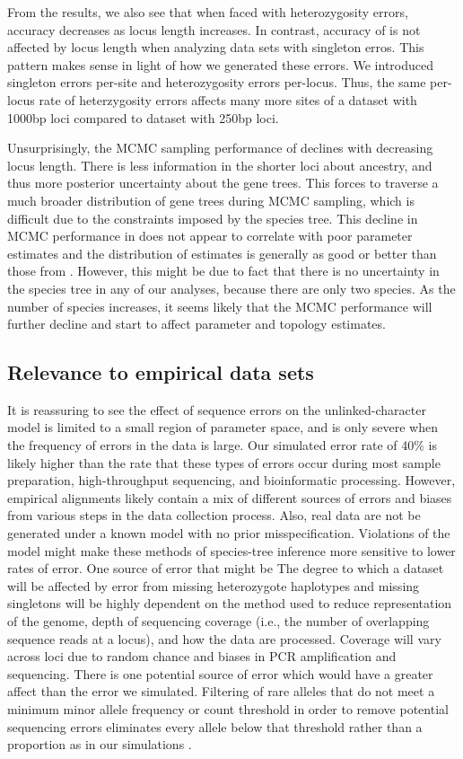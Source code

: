 From the \ecoevolity results,
we also see that when faced with heterozygosity errors,
accuracy decreases as locus length increases.
In contrast, accuracy of \ecoevolity is not affected by locus
length when analyzing data sets with singleton erros.
This pattern makes sense in light of how we generated these errors.
We introduced singleton errors per-site and heterozygosity errors per-locus.
Thus, the same per-locus rate of heterzygosity errors affects many more sites
of a dataset with 1000bp loci compared to dataset with 250bp loci.

Unsurprisingly, the MCMC sampling performance of \beast declines with
decreasing locus length.
There is less information in the shorter loci about ancestry, and thus more
posterior uncertainty about the gene trees.
This forces \beast to traverse a much broader distribution of gene trees during
MCMC sampling, which is difficult due to the constraints imposed by the
species tree.
This decline in MCMC performance in \beast does not appear to correlate with
poor parameter estimates and the distribution of estimates is generally as good
or better than those from \ecoevolity. 
However, this might be due to fact that there is no uncertainty in the species
tree in any of our analyses, because there are only two species.
As the number of species increases, it seems likely that the MCMC performance
will further decline and start to affect parameter and topology estimates.


\subsection{Relevance to empirical data sets}
It is reassuring to see the effect of sequence errors on the unlinked-character
model is limited to a small region of parameter space, and is only severe when
the frequency of errors in the data is large.
Our simulated error rate of 40\% is likely higher than the rate that these
types of errors occur during most sample preparation, high-throughput sequencing,
and bioinformatic processing.
However, empirical alignments likely contain a mix of different sources of
errors and biases from various steps in the data collection process.
Also, real data are not be generated under a known model with no prior
misspecification.
Violations of the model might make these methods of species-tree inference more
sensitive to lower rates of error. One source of error that might be 
The degree to which a dataset will be affected by error from missing
heterozygote haplotypes and missing singletons will be highly dependent on the 
method used to reduce representation of the genome, depth of sequencing 
coverage (i.e., the number of overlapping sequence reads at
a locus), and how the data are processed. Coverage will vary across loci due 
to random chance and biases in PCR amplification and sequencing.
There is one potential source of error which would have a greater 
affect than the error we simulated. Filtering of rare alleles that do not meet 
a minimum minor allele frequency or count threshold in order to remove potential 
sequencing errors eliminates every allele below that threshold rather than a 
proportion as in our simulations 
\citep{rochetteStacksAnalyticalMethods2019, linckMinorAlleleFrequency2019}.


